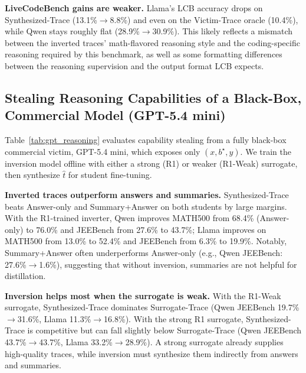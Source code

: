 \documentclass{article}
\begin{document}
\noindent\textbf{LiveCodeBench gains are weaker.} Llama's LCB accuracy drops on Synthesized-Trace (13.1\%$\rightarrow$8.8\%) and even on the Victim-Trace oracle (10.4\%), while Qwen stays roughly flat (28.9\%$\rightarrow$30.9\%). This likely reflects a mismatch between the inverted traces' math-flavored reasoning style and the coding-specific reasoning required by this benchmark, as well as some formatting differences between the reasoning supervision and the output format LCB expects.

\subsection{Stealing Reasoning Capabilities of a Black-Box, Commercial Model (GPT-5.4 mini)}
\label{sec:eval-gpt-stealing}

Table~\ref{tab:gpt_reasoning} evaluates capability stealing from a fully black-box commercial victim, GPT-5.4 mini, which exposes only $(x,b^\star,y)$. We train the inversion model offline with either a strong (R1) or weaker (R1-Weak) surrogate, then synthesize $\hat{t}$ for student fine-tuning.

\noindent\textbf{Inverted traces outperform answers and summaries.} Synthesized-Trace beats Answer-only and Summary+Answer on both students by large margins. With the R1-trained inverter, Qwen improves MATH500 from 68.4\% (Answer-only) to 76.0\% and JEEBench from 27.6\% to 43.7\%; Llama improves on MATH500 from 13.0\% to 52.4\% and JEEBench from 6.3\% to 19.9\%. Notably, Summary+Answer often underperforms Answer-only (e.g., Qwen JEEBench: 27.6\%$\rightarrow$1.6\%), suggesting that without inversion, summaries are not helpful for distillation.


\noindent\textbf{Inversion helps most when the surrogate is weak.} With the R1-Weak surrogate, Synthesized-Trace dominates Surrogate-Trace (Qwen JEEBench 19.7\%$\rightarrow$31.6\%, Llama 11.3\%$\rightarrow$16.8\%). With the strong R1 surrogate, Synthesized-Trace is competitive but can fall slightly below Surrogate-Trace (Qwen JEEBench 43.7\%$\rightarrow$43.7\%, Llama 33.2\%$\rightarrow$28.9\%).   A strong surrogate already supplies high-quality traces, while inversion must synthesize them indirectly from answers and summaries.
\end{document}
